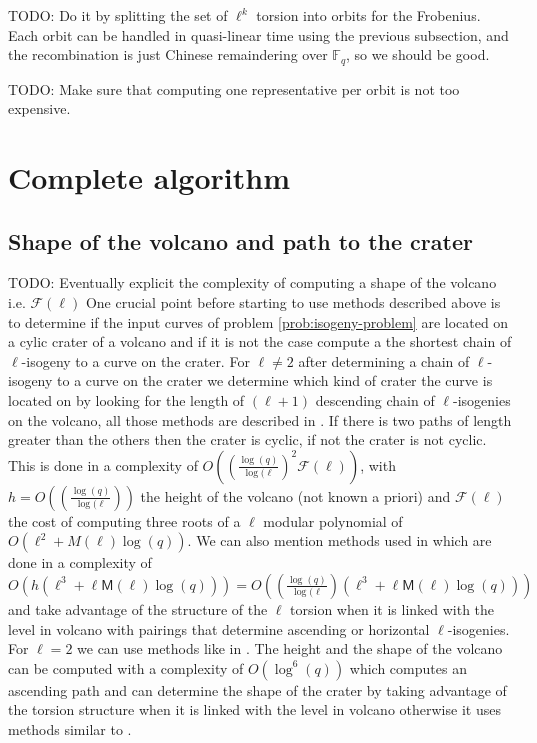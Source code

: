 \documentclass{lms}
\newcommand{\todo}[1]{{\color{red}TODO: #1}}
\newcommand{\F}{\mathbb{F}}
\begin{document}
\todo{Do it by splitting the set of $\ell^k$ torsion into orbits for
  the Frobenius. Each orbit can be handled in quasi-linear time using
  the previous subsection, and the recombination is just Chinese
  remaindering over $\F_q$, so we should be good.}

\todo{Make sure that computing one representative per orbit is not too
  expensive.}

\section{Complete algorithm}
\label{sec:complete-algorithm}
\subsection{Shape of the volcano and path to the crater}
	\label{sub:shape-volcano}
\todo{Eventually explicit the complexity of computing a shape of the volcano i.e. $\mathcal{F}(\ell)$}
One crucial point before starting to use methods described above is to determine if the input curves of problem \ref{prob:isogeny-problem} are located on a cylic crater of a volcano and if it is not the case compute a the shortest chain of $\ell$-isogeny to a curve on the crater. 
  \newline
  For $\ell \neq 2$ after determining a chain of $\ell$-isogeny to a curve on the crater we determine which kind of crater the curve is located on by looking for  the length of $(\ell+1)$ descending chain of $\ell$-isogenies on the volcano, all those methods are described in \cite{volcano}. If there is two paths of length greater than the others then the crater is cyclic, if not the crater is not cyclic. This is done in a complexity of $O( ( \frac{\log(q)}{\log(\ell})^2 \mathcal{F}(\ell) )$, with $h=O(( \frac{\log(q)}{\log(\ell}))$ the height of the volcano (not known a priori) and $\mathcal{F}(\ell)$ the cost of computing three roots of a $\ell$ modular polynomial of $O(\ell^2+M(\ell)\log(q))$. We can also mention methods used in \cite{IonicaJ10} which are done in a complexity of $O(h(\ell^3+\ell \mathsf{M}(\ell) \log(q)))=O(( \frac{\log(q)}{\log(\ell})(\ell^3+\ell \mathsf{M}(\ell) \log(q)))$ and take advantage of the structure of the $\ell$ torsion when it is linked with the level in volcano with pairings that determine ascending or horizontal $\ell$-isogenies. %
\newline 
For $\ell=2$ we can use methods like in \cite{MiretMRV05}. The height and the shape of the volcano can be computed with a complexity of $O(\log^6(q))$ which computes an ascending path and can determine the shape of the crater by taking advantage of the torsion structure when it is linked with the level in volcano otherwise it uses methods similar to \cite{volcano}.
  
\end{document}

